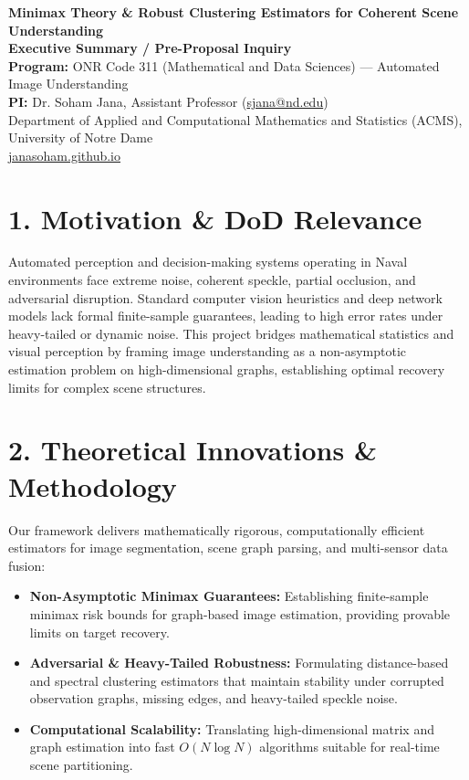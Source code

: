 \documentclass[11pt,a4paper]{article}
\begin{document}
\pagestyle{empty} %

\begin{center}
    {\LARGE \bfseries \color{navyblue} Minimax Theory \& Robust Clustering Estimators for Coherent Scene Understanding} \\[0.4em]
    {\large \textbf{Executive Summary / Pre-Proposal Inquiry}} \\[0.3em]
    \textbf{Program:} ONR Code 311 (Mathematical and Data Sciences) --- Automated Image Understanding \\
    \textbf{PI:} Dr. Soham Jana, Assistant Professor (\href{mailto:sjana@nd.edu}{sjana@nd.edu}) \\
    Department of Applied and Computational Mathematics and Statistics (ACMS), University of Notre Dame \\
    \href{https://janasoham.github.io/}{janasoham.github.io}
\end{center}

\vspace{-0.5em}

\section*{1. Motivation \& DoD Relevance}
Automated perception and decision-making systems operating in Naval environments face extreme noise, coherent speckle, partial occlusion, and adversarial disruption. Standard computer vision heuristics and deep network models lack formal finite-sample guarantees, leading to high error rates under heavy-tailed or dynamic noise. This project bridges mathematical statistics and visual perception by framing image understanding as a non-asymptotic estimation problem on high-dimensional graphs, establishing optimal recovery limits for complex scene structures.

\section*{2. Theoretical Innovations \& Methodology}
Our framework delivers mathematically rigorous, computationally efficient estimators for image segmentation, scene graph parsing, and multi-sensor data fusion:
\begin{itemize}
    \item \textbf{Non-Asymptotic Minimax Guarantees:} Establishing finite-sample minimax risk bounds for graph-based image estimation, providing provable limits on target recovery.
    \item \textbf{Adversarial \& Heavy-Tailed Robustness:} Formulating distance-based and spectral clustering estimators that maintain stability under corrupted observation graphs, missing edges, and heavy-tailed speckle noise.
    \item \textbf{Computational Scalability:} Translating high-dimensional matrix and graph estimation into fast $O(N \log N)$ algorithms suitable for real-time scene partitioning.
\end{itemize}
\end{document}
